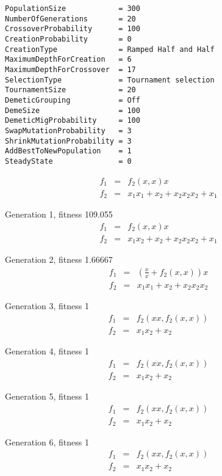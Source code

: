 

\begin{verbatim}
PopulationSize            = 300
NumberOfGenerations       = 20
CrossoverProbability      = 100
CreationProbability       = 0
CreationType              = Ramped Half and Half
MaximumDepthForCreation   = 6
MaximumDepthForCrossover  = 17
SelectionType             = Tournament selection
TournamentSize            = 20
DemeticGrouping           = Off
DemeSize                  = 100
DemeticMigProbability     = 100
SwapMutationProbability   = 3
ShrinkMutationProbability = 3
AddBestToNewPopulation    = 1
SteadyState               = 0
\end{verbatim}

\begin{eqnarray}
f_1 & = & f_2(x,x) x\nonumber \\
f_2 & = & x_1 x_1+x_2+x_2 x_2 x_2+x_1\nonumber 
\end{eqnarray}

Generation 1, fitness 109.055
\begin{eqnarray}
f_1 & = & f_2(x,x) x\nonumber \\
f_2 & = & x_1 x_2+x_2+x_2 x_2 x_2+x_1\nonumber 
\end{eqnarray}

Generation 2, fitness 1.66667
\begin{eqnarray}
f_1 & = & \left(\frac{x}{x}+f_2(x,x)\right) x\nonumber \\
f_2 & = & x_1 x_1+x_2+x_2 x_2 x_2\nonumber 
\end{eqnarray}

Generation 3, fitness 1
\begin{eqnarray}
f_1 & = & f_2(x x,f_2(x,x))\nonumber \\
f_2 & = & x_1 x_2+x_2\nonumber 
\end{eqnarray}

Generation 4, fitness 1
\begin{eqnarray}
f_1 & = & f_2(x x,f_2(x,x))\nonumber \\
f_2 & = & x_1 x_2+x_2\nonumber 
\end{eqnarray}

Generation 5, fitness 1
\begin{eqnarray}
f_1 & = & f_2(x x,f_2(x,x))\nonumber \\
f_2 & = & x_1 x_2+x_2\nonumber 
\end{eqnarray}

Generation 6, fitness 1
\begin{eqnarray}
f_1 & = & f_2(x x,f_2(x,x))\nonumber \\
f_2 & = & x_1 x_2+x_2\nonumber 
\end{eqnarray}

